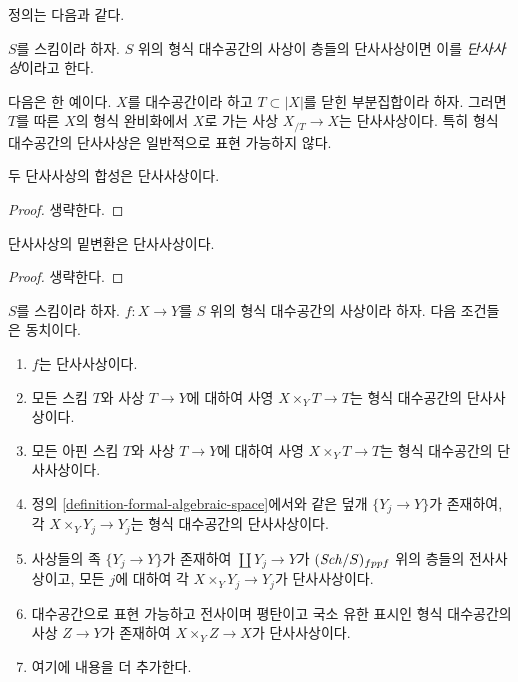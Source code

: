 \noindent
정의는 다음과 같다.

\begin{definition}
\label{definition-monomorphism}
$S$를 스킴이라 하자. $S$ 위의 형식 대수공간의 사상이 층들의
단사사상이면 이를 {\it 단사사상}이라고 한다.
\end{definition}

\noindent
다음은 한 예이다. $X$를 대수공간이라 하고 $T \subset |X|$를 닫힌
부분집합이라 하자. 그러면 $T$를 따른 $X$의 형식 완비화에서 $X$로
가는 사상 $X_{/T} \to X$는 단사사상이다. 특히 형식 대수공간의
단사사상은 일반적으로 표현 가능하지 않다.

\begin{lemma}
\label{lemma-composition-monomorphism}
두 단사사상의 합성은 단사사상이다.
\end{lemma}

\begin{proof}
생략한다.
\end{proof}

\begin{lemma}
\label{lemma-base-change-monomorphism}
단사사상의 밑변환은 단사사상이다.
\end{lemma}

\begin{proof}
생략한다.
\end{proof}

\begin{lemma}
\label{lemma-characterize-monomorphisms}
$S$를 스킴이라 하자. $f : X \to Y$를 $S$ 위의 형식 대수공간의
사상이라 하자. 다음 조건들은 동치이다.
\begin{enumerate}
\item $f$는 단사사상이다.
\item 모든 스킴 $T$와 사상 $T \to Y$에 대하여 사영
$X \times_Y T \to T$는 형식 대수공간의 단사사상이다.
\item 모든 아핀 스킴 $T$와 사상 $T \to Y$에 대하여 사영
$X \times_Y T \to T$는 형식 대수공간의 단사사상이다.
\item 정의 \ref{definition-formal-algebraic-space}에서와 같은 덮개
$\{Y_j \to Y\}$가 존재하여, 각 $X \times_Y Y_j \to Y_j$는 형식
대수공간의 단사사상이다.
\item 사상들의 족 $\{Y_j \to Y\}$가 존재하여
$\coprod Y_j \to Y$가 $(\mathit{Sch}/S)_{fppf}$ 위의 층들의 전사사상이고,
모든 $j$에 대하여 각 $X \times_Y Y_j \to Y_j$가 단사사상이다.
\item 대수공간으로 표현 가능하고 전사이며 평탄이고 국소 유한 표시인
형식 대수공간의 사상 $Z \to Y$가 존재하여
$X \times_Y Z \to X$가 단사사상이다. %
\item 여기에 내용을 더 추가한다. %
\end{enumerate}
\end{lemma}

